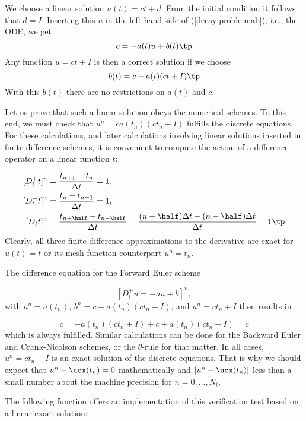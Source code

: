 \documentclass[graybox,sectrefs,envcountresetchap,open=right,final]{svmonodo}
\begin{document}
We choose a linear solution $u(t) = ct + d$. From the initial condition it
follows that $d=I$.
Inserting this $u$ in the left-hand side of (\ref{decay:problem:ab}), i.e.,
the ODE, we get
\[ c = -a(t)u + b(t) \tp  \]
Any function $u=ct+I$ is then a correct solution if we choose
\[ b(t) = c + a(t)(ct + I) \tp  \]
With this $b(t)$ there are no restrictions on $a(t)$ and $c$.

Let us prove that such a linear solution obeys the numerical
schemes. To this end, we must check that $u^n = ca(t_n)(ct_n+I)$
fulfills the discrete equations. For these calculations, and
later calculations involving linear solutions inserted in
finite difference schemes, it is convenient to
compute the action of a difference operator on a linear function $t$:

\begin{align}
\lbrack D_t^+ t\rbrack^n &= \frac{t_{n+1}-t_n}{\Delta t}=1,
\label{decay:fd2:Dop:tn:fw}\\ 
\lbrack D_t^- t\rbrack^n &= \frac{t_{n}-t_{n-1}}{\Delta t}=1,
\label{decay:fd2:Dop:tn:bw}\\ 
\lbrack D_t t\rbrack^n &= \frac{t_{n+\half}-t_{n-\half}}{\Delta t}=\frac{(n+\half)\Delta t - (n-\half)\Delta t}{\Delta t}=1
\label{decay:fd2:Dop:tn:cn}
\tp
\end{align}
Clearly, all three finite difference approximations to the derivative are
exact for $u(t)=t$ or its mesh function counterpart $u^n = t_n$.

The difference equation for the Forward Euler scheme

\[ [D^+_t u = -au + b]^n, \]
with $a^n=a(t_n)$, $b^n=c + a(t_n)(ct_n + I)$, and $u^n=ct_n + I$
then results in

\[ c = -a(t_n)(ct_n+I) + c + a(t_n)(ct_n + I) = c \]
which is always fulfilled. Similar calculations can be done for the
Backward Euler and Crank-Nicolson schemes, or the $\theta$-rule for
that matter. In all cases, $u^n=ct_n +I$ is an exact solution of
the discrete equations. That is why we should expect that
$u^n - \uex(t_n) =0$ mathematically and $|u^n - \uex(t_n)|$ less
than a small number about the machine precision for $n=0,\ldots,N_t$.

The following function offers an implementation of this verification
test based on a linear exact solution:
\end{document}
